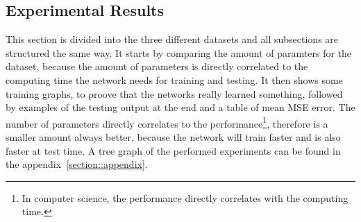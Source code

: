  \subsection{Experimental Results}
  This section is divided into the three different datasets and all subsections are structured the same way. It starts by comparing the amount of paramters
  for the dataset, because the amount of parameters is directly correlated to the computing time the network needs for training and testing. It then shows
  some training graphs, to proove that the networks really learned something, followed by examples of the testing output at the end and a table of mean MSE error.
  The number of parameters directly correlates to the performance\footnote{In computer science, the performance directly correlates with the computing time.}, 
  therefore is a smaller amount always better, because the network will train faster and is also faster at test time. A tree graph of the performed experiments
  can be found in the appendix~\ref{section::appendix}.
  
